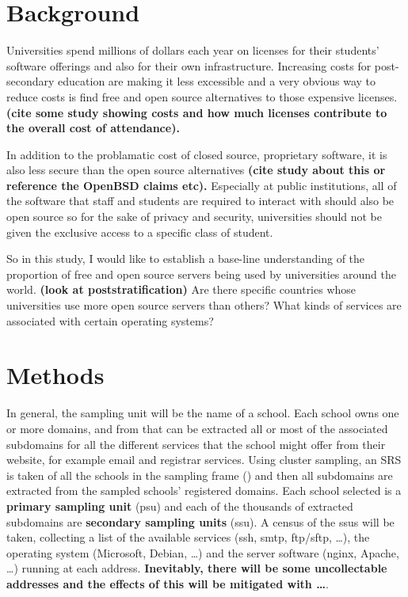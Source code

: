 \documentclass{article}
\theoremstyle{definition}
\begin{document}
\begin{flushleft}

\section{Background}
Universities spend millions of dollars each year on licenses
for their students' software offerings and also for their own
infrastructure. Increasing costs for post-secondary education
are making it less excessible and a very obvious way to reduce
costs is find free and open source alternatives to those expensive
licenses.
\textbf{(cite some study showing costs and how much licenses contribute
to the overall cost of attendance).}

In addition to the problamatic cost of closed source, proprietary
software, it is also less secure than the open source alternatives
\textbf{(cite study about this or reference the OpenBSD claims etc).}
Especially at public institutions, all of the software that staff and
students are required to interact with should also be open source
so for the sake of privacy and security, universities should not
be given the exclusive access to a specific class of student.

So in this study, I would like to establish a base-line understanding
of the proportion of free and open source servers being used by
universities around the world. \textbf{(look at poststratification)} Are there specific countries whose universities
use more open source servers than others? What kinds of services
are associated with certain operating systems?

\section{Methods}
In general, the sampling unit will be the name of a school.
Each school owns one or more domains, and from that can be
extracted all or most of the associated subdomains for all
the different services that the school might offer from their
website, for example email and registrar services. Using cluster
sampling, an SRS is taken of all the schools in the sampling
frame (\cite{Hipo}) and then all subdomains are extracted from the
sampled schools' registered domains. Each school selected is
a \textbf{primary sampling unit} (psu) and each of the thousands
of extracted subdomains are \textbf{secondary sampling units} (ssu).
A census of the ssus will be taken, collecting a list of
the available
services (ssh, smtp, ftp/sftp, \dots),
the operating system (Microsoft, Debian, \dots) and
the server software (nginx, Apache, \dots)
running at each address.
\textbf{Inevitably, there will be some uncollectable
addresses and the effects of this will be mitigated with \dots}.


\end{flushleft}
\end{document}
